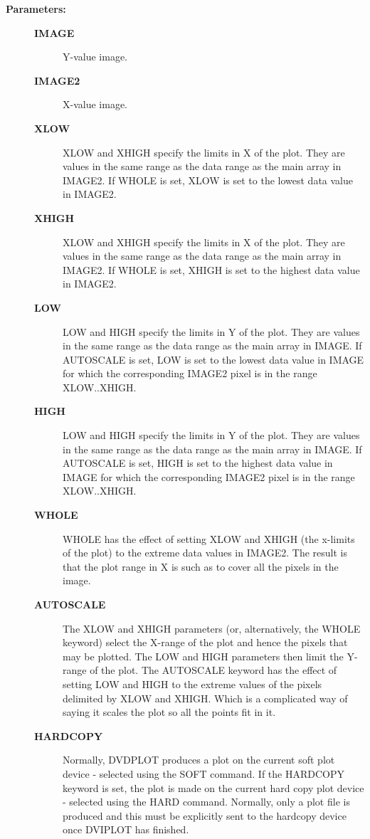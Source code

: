 \begin{description}
\item [{\bf Parameters:}]
\begin{description}
\item [{\bf IMAGE}]
 Y-value image.
\item [{\bf IMAGE2}]
 X-value image.
\item [{\bf XLOW}]
 XLOW and XHIGH specify the limits in X of the plot.
 They are values in the same range as the data range
 as the main array in IMAGE2.  If WHOLE is set, XLOW
 is set to the lowest data value in IMAGE2.
\item [{\bf XHIGH}]
 XLOW and XHIGH specify the limits in X of the plot.
 They are values in the same range as the data range
 as the main array in IMAGE2.  If WHOLE is set, XHIGH
 is set to the highest data value in IMAGE2.
\item [{\bf LOW}]
 LOW and HIGH specify the limits in Y of the plot.
 They are values in the same range as the data range
 as the main array in IMAGE.  If AUTOSCALE is set, LOW
 is set to the lowest data value in IMAGE for which
 the corresponding IMAGE2 pixel is in the range XLOW..XHIGH.
\item [{\bf HIGH}]
 LOW and HIGH specify the limits in Y of the plot.
 They are values in the same range as the data range
 as the main array in IMAGE.  If AUTOSCALE is set, HIGH
 is set to the highest data value in IMAGE for which
 the corresponding IMAGE2 pixel is in the range XLOW..XHIGH.
\item [{\bf WHOLE}]
 WHOLE has the effect of setting XLOW and XHIGH (the x-limits
 of the plot) to the extreme data values in IMAGE2.  The
 result is that the plot range in X is such as to cover all
 the pixels in the image.
\item [{\bf AUTOSCALE}]
 The XLOW and XHIGH parameters (or, alternatively, the WHOLE
 keyword) select the X-range of the plot and hence the pixels
 that may be plotted.  The LOW and HIGH parameters then limit
 the Y-range of the plot.  The AUTOSCALE keyword has the effect
 of setting LOW and HIGH to the extreme values of the pixels
 delimited by XLOW and XHIGH.  Which is a complicated way of
 saying it scales the plot so all the points fit in it.
\item [{\bf HARDCOPY}]
 Normally, DVDPLOT produces a plot on the current soft plot
 device - selected using the SOFT command.  If the HARDCOPY
 keyword is set, the plot is made on the current hard
 copy plot device - selected using the HARD command.
 Normally, only a plot file is produced and this must be
 explicitly sent to the hardcopy device once DVIPLOT has
 finished.
\end{description}


\end{description}
